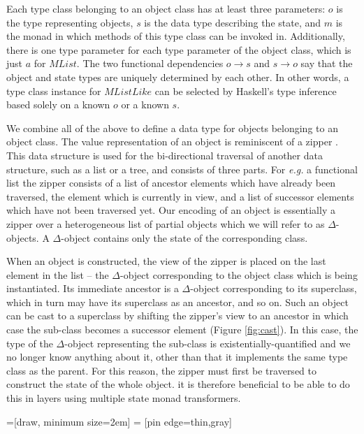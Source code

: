 \documentclass[authoryear,preprint]{sigplanconf}
\begin{document}
Each type class belonging to an object class has at least three parameters: $o$ is the type representing objects, $s$ is the data type describing the state, and $m$ is the monad in which methods of this type class can be invoked in. Additionally, there is one type parameter for each type parameter of the object class, which is just $a$ for $\mathit{MList}$. The two functional dependencies $o \to s$ and $s \to o$ say that the object and state types are uniquely determined by each other. In other words, a type class instance for $\mathit{MListLike}$ can be selected by Haskell's type inference based solely on a known $o$ or a known $s$.

We combine all of the above to define a data type for objects belonging to an object class. The value representation of an object is reminiscent of a zipper \cite{huet1997zipper}. This data structure is used for the bi-directional traversal of another data structure, such as a list or a tree, and consists of three parts. For \emph{e.g.} a functional list the zipper consists of a list of ancestor elements which have already been traversed, the element which is currently in view, and a list of successor elements which have not been traversed yet. Our encoding of an object is essentially a zipper over a heterogeneous list of partial objects which we will refer to as $\Delta$-objects. A $\Delta$-object contains only the state of the corresponding class.

When an object is constructed, the view of the zipper is placed on the last element in the list -- the $\Delta$-object corresponding to the object class which is being instantiated. Its immediate ancestor is a $\Delta$-object corresponding to its superclass, which in turn may have its superclass as an ancestor, and so on. Such an object can be cast to a superclass by shifting the zipper's view to an ancestor in which case the sub-class becomes a successor element (Figure \ref{fig:cast}). In this case, the type of the $\Delta$-object representing the sub-class is existentially-quantified and we no longer know anything about it, other than that it implements the same type class as the parent. For this reason, the zipper must first be traversed to construct the state of the whole object. it is therefore beneficial to be able to do this in layers using multiple state monad transformers.

=[draw, minimum size=2em]
 = [pin edge={thin,gray}]
\end{document}
